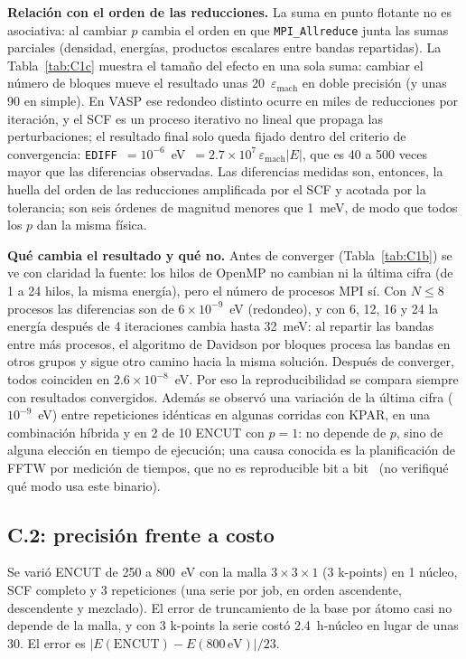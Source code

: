 \documentclass[11pt,a4paper]{article}
\newcommand{\eps}{\varepsilon_\mathrm{mach}}
\newcommand{\cod}[1]{\texttt{#1}}
\begin{document}
\textbf{Relación con el orden de las reducciones.} La suma en punto flotante no es asociativa: al cambiar $p$
cambia el orden en que \cod{MPI\_Allreduce} junta las sumas parciales (densidad, energías, productos escalares
entre bandas repartidas). La Tabla~\ref{tab:C1c} muestra el tamaño del efecto en una sola suma: cambiar
el número de bloques mueve el resultado unas 20~$\eps$ en doble precisión (y unas 90 en simple). En VASP ese
redondeo distinto ocurre en miles de reducciones por iteración, y el SCF es un proceso iterativo no lineal que
propaga las perturbaciones; el resultado final solo queda fijado dentro del criterio de convergencia:
\cod{EDIFF}~$=10^{-6}$~eV~$=2.7\times10^{7}\,\eps|E|$, que es 40 a 500 veces mayor que las diferencias
observadas. Las diferencias medidas son, entonces, la huella del orden de las reducciones amplificada por el
SCF y acotada por la tolerancia; son seis órdenes de magnitud menores que 1~meV, de modo que todos los $p$ dan
la misma física.

\textbf{Qué cambia el resultado y qué no.} Antes de converger (Tabla~\ref{tab:C1b}) se ve con claridad la
fuente: los hilos de OpenMP no cambian ni la última cifra (de 1 a 24 hilos, la misma energía), pero
el número de procesos MPI sí. Con $N\le8$ procesos las diferencias son de $6\times10^{-9}$~eV (redondeo), y con
6, 12, 16 y 24 la energía después de 4 iteraciones cambia hasta 32~meV: al repartir las bandas entre más
procesos, el algoritmo de Davidson por bloques procesa las bandas en otros grupos y sigue otro camino hacia la
misma solución. Después de converger, todos coinciden en $2.6\times10^{-8}$~eV. Por eso la reproducibilidad
se compara siempre con resultados convergidos. Además se observó una variación de la última cifra
($10^{-9}$~eV) entre repeticiones idénticas en algunas corridas con KPAR, en una combinación híbrida y en 2 de
10 ENCUT con $p=1$: no depende de $p$, sino de alguna elección en tiempo de ejecución; una causa conocida es la
planificación de FFTW por medición de tiempos, que no es reproducible bit a bit~\cite{fftw-rep} (no verifiqué
qué modo usa este binario).

\subsection{C.2: precisión frente a costo}\label{sec:c2}
Se varió ENCUT de 250 a 800~eV con la malla $3\times3\times1$ (3 k-points) en 1 núcleo, SCF completo y 3
repeticiones (una serie por job, en orden ascendente, descendente y mezclado). El error de truncamiento de la
base por átomo casi no depende de la malla, y con 3 k-points la serie costó 2.4~h-núcleo en lugar de unas 30.
El error es $|E(\text{ENCUT})-E(800\,\text{eV})|/23$.
\end{document}
